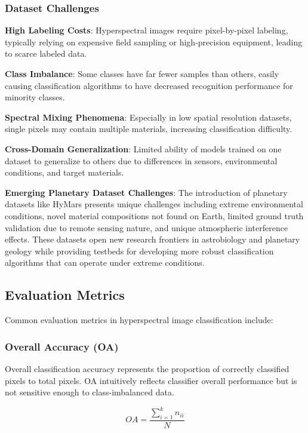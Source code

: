 \documentclass[journal]{IEEEtran}
\begin{document}
\subsubsection{Dataset Challenges}

\textbf{High Labeling Costs}: Hyperspectral images require pixel-by-pixel labeling, typically relying on expensive field sampling or high-precision equipment, leading to scarce labeled data.

\textbf{Class Imbalance}: Some classes have far fewer samples than others, easily causing classification algorithms to have decreased recognition performance for minority classes.

\textbf{Spectral Mixing Phenomena}: Especially in low spatial resolution datasets, single pixels may contain multiple materials, increasing classification difficulty.

\textbf{Cross-Domain Generalization}: Limited ability of models trained on one dataset to generalize to others due to differences in sensors, environmental conditions, and target materials.

\textbf{Emerging Planetary Dataset Challenges}: The introduction of planetary datasets like HyMars presents unique challenges including extreme environmental conditions, novel material compositions not found on Earth, limited ground truth validation due to remote sensing nature, and unique atmospheric interference effects. These datasets open new research frontiers in astrobiology and planetary geology while providing testbeds for developing more robust classification algorithms that can operate under extreme conditions.

\subsection{Evaluation Metrics}

Common evaluation metrics in hyperspectral image classification include:

\subsubsection{Overall Accuracy (OA)}

Overall classification accuracy represents the proportion of correctly classified pixels to total pixels. OA intuitively reflects classifier overall performance but is not sensitive enough to class-imbalanced data.

\begin{equation}
OA = \frac{\sum_{i=1}^k n_{ii}}{N}
\end{equation}
\end{document}
